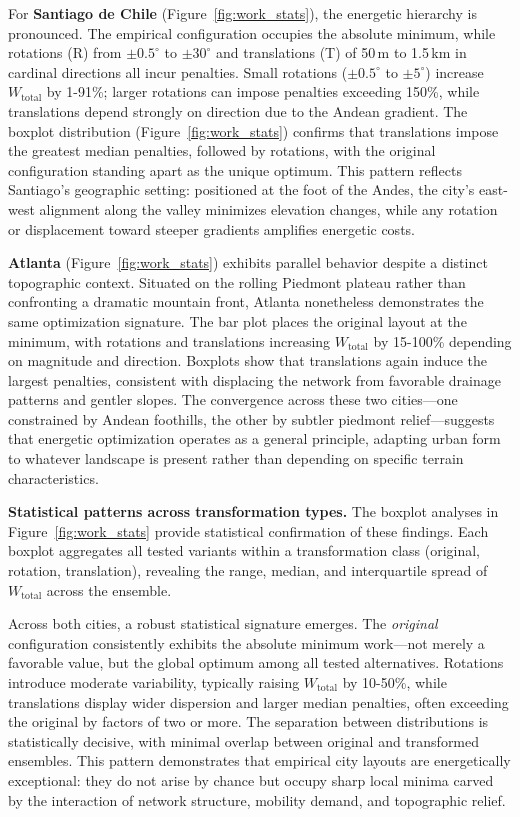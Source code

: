 \documentclass[twocolumn,amsmath,amssymb,floatfix,nature,shownopacs,footinbib,superscriptaddress]{revtex4-1} %
\begin{document}
For \textbf{Santiago de Chile} (Figure~\ref{fig:work_stats}), the energetic hierarchy is pronounced.  
The empirical configuration occupies the absolute minimum, while rotations (R) from $\pm0.5^{\circ}$ to $\pm30^{\circ}$ and translations (T) of 50\,m to 1.5\,km in cardinal directions all incur penalties.  
Small rotations ($\pm0.5^{\circ}$ to $\pm5^{\circ}$) increase $W_{\text{total}}$ by 1-91\%; larger rotations can impose penalties exceeding 150\%, while translations depend strongly on direction due to the Andean gradient.  
The boxplot distribution (Figure~\ref{fig:work_stats}) confirms that translations impose the greatest median penalties, followed by rotations, with the original configuration standing apart as the unique optimum.  
This pattern reflects Santiago's geographic setting: positioned at the foot of the Andes, the city's east-west alignment along the valley minimizes elevation changes, while any rotation or displacement toward steeper gradients amplifies energetic costs.

\textbf{Atlanta} (Figure~\ref{fig:work_stats}) exhibits parallel behavior despite a distinct topographic context.  
Situated on the rolling Piedmont plateau rather than confronting a dramatic mountain front, Atlanta nonetheless demonstrates the same optimization signature.  
The bar plot places the original layout at the minimum, with rotations and translations increasing $W_{\text{total}}$ by 15-100\% depending on magnitude and direction.  
Boxplots show that translations again induce the largest penalties, consistent with displacing the network from favorable drainage patterns and gentler slopes.  
The convergence across these two cities—one constrained by Andean foothills, the other by subtler piedmont relief—suggests that energetic optimization operates as a general principle, adapting urban form to whatever landscape is present rather than depending on specific terrain characteristics.

\vspace{0.5em}
\noindent\textbf{Statistical patterns across transformation types.}  
The boxplot analyses in Figure~\ref{fig:work_stats} provide statistical confirmation of these findings.  
Each boxplot aggregates all tested variants within a transformation class (original, rotation, translation), revealing the range, median, and interquartile spread of $W_{\text{total}}$ across the ensemble.

Across both cities, a robust statistical signature emerges.  
The \textit{original} configuration consistently exhibits the absolute minimum work—not merely a favorable value, but the global optimum among all tested alternatives.  
Rotations introduce moderate variability, typically raising $W_{\text{total}}$ by 10-50\%, while translations display wider dispersion and larger median penalties, often exceeding the original by factors of two or more.  
The separation between distributions is statistically decisive, with minimal overlap between original and transformed ensembles.  
This pattern demonstrates that empirical city layouts are energetically exceptional: they do not arise by chance but occupy sharp local minima carved by the interaction of network structure, mobility demand, and topographic relief.
\end{document}
